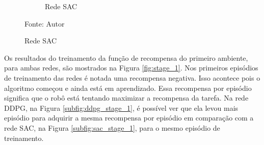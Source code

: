 \begin{figure}[H]
\begin{center}
\begin{subfigure}[b]{0.60\textwidth}
\begin{subfigure}[b]{0.24\textwidth}
        \end{subfigure}
        \caption{Rede SAC}
        \label{subfig:simulated_env1_sac}
    \end{subfigure}
    \label{fig:sim_env1}
    \end{center}
\small{Fonte: Autor}
\end{figure}

Os resultados do treinamento da função de recompensa do primeiro ambiente, para ambas redes, são mostrados na Figura \ref{fig:stage_1}. Nos primeiros episódios de treinamento das redes é notada uma recompensa negativa.
Isso acontece pois o algoritmo começou e ainda está em aprendizado.
Essa recompensa por episódio significa que o robô está tentando maximizar a recompensa da tarefa.
Na rede DDPG, na Figura \ref{subfig:ddpg_stage_1}, é possível ver que ela levou mais episódio para adquirir a mesma recompensa por episódio em comparação com a rede SAC, na Figura \ref{subfig:sac_stage_1}, para o mesmo episódio de treinamento.

